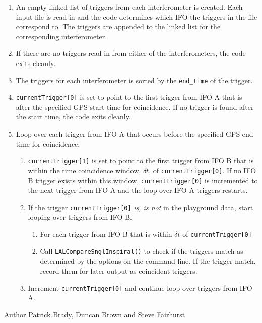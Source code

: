 \begin{entry}
\begin{enumerate}
\item An empty linked list of triggers from each interferometer is created.
Each input file is read in and the code determines which IFO the triggers in
the file correspond to. The triggers are appended to the linked list for the
corresponding interferometer.

\item If there are no triggers read in from either of the interferometers,
the code exits cleanly.

\item The triggers for each interferometer is sorted by the \texttt{end\_time}
of the trigger.

\item \texttt{currentTrigger[0]} is set to point to the first trigger from IFO
A that is after the specified GPS start time for coincidence. If no trigger is
found after the start time, the code exits cleanly.

\item Loop over each trigger from IFO A that occurs before the specified GPS
end time for coincidence:
\begin{enumerate}
\item \texttt{currentTrigger[1]} is set to point to the first trigger from IFO
B that is within the time coincidence window, $\delta t$, of
\texttt{currentTrigger[0]}. If no IFO B trigger exists within this window,
\texttt{currentTrigger[0]} is incremented to the next trigger from IFO A and
the loop over IFO A triggers restarts.

\item If the trigger \texttt{currentTrigger[0]} \emph{is, is not} in the
playground data, start looping over triggers from IFO B.
\begin{enumerate}
\item For each trigger from IFO B that is within $\delta t$ of
\texttt{currentTrigger[0]}
\item Call \texttt{LALCompareSnglInspiral()} to check if the triggers match as
determined by the options on the command line. If the trigger match, record
them for later output as coincident triggers.
\end{enumerate}

\item Increment \texttt{currentTrigger[0]} and continue loop over triggers
from IFO A.
\end{enumerate}
\end{enumerate}

\item[Author] 
Patrick Brady, Duncan Brown and Steve Fairhurst
\end{entry}


